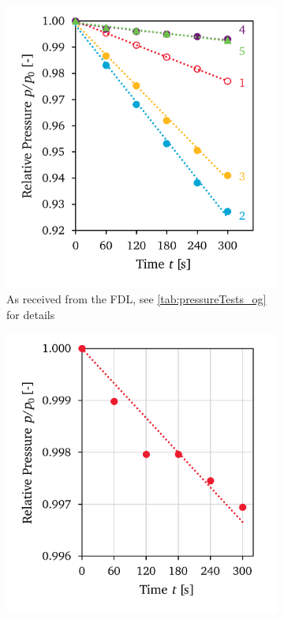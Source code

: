             \begin{figure}[h]
                \centering
                \begin{subfigure}[t]{0.47\textwidth}
                    \centering
                    \includegraphics[width=\textwidth]{assets/3 design/pressureTest_original.pdf}
                    \caption{As received from the FDL, see \autoref{tab:pressureTests_og} for details}
                    \label{fig:pressureTest_og}
                \end{subfigure}
                \hfill
                \begin{subfigure}[t]{0.47\textwidth}
                    \centering
                    \includegraphics[width=\textwidth]{assets/3 design/pressureTest_newWindows.pdf}

\end{subfigure}
\end{figure}
